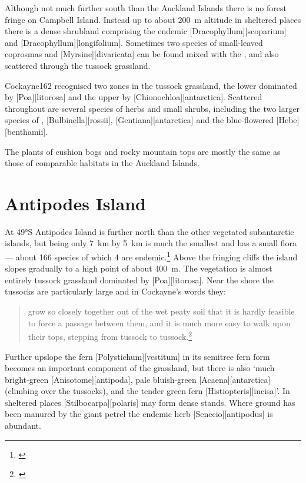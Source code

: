 Although not much further south than the Auckland Islands there is no forest fringe on Campbell Island.
Instead up to about \SI{200}{\metre} altitude in sheltered places there is a dense shrubland comprising the endemic [Dracophyllum][scoparium] and [Dracophyllum][longifolium].
Sometimes two species of small-leaved coprosmas and [Myrsine][divaricata] can be found mixed with the , and also scattered through the tussock grassland.

Cockayne162 recognised two zones in the tussock grassland, the lower dominated by [Poa][litorosa] and the upper by [Chionochloa][antarctica].
Scattered throughout are several species of herbs and small shrubs, including the two larger species of , [Bulbinella][rossii], [Gentiana][antarctica] and the blue-flowered [Hebe][benthamii].

The plants of cushion bogs and rocky mountain tops are mostly the same as those of comparable habitats in the Auckland Islands.

\section{Antipodes Island}

At \ang{49}S Antipodes Island is further north than the other vegetated subantarctic islands, but being only \SI{7}{\kilo\metre} by \SI{5}{\kilo\metre} is much the smallest and has a small flora --- about 166 species of which 4 are endemic.\footnote{\cite{williams1982species}}
Above the fringing cliffs the island slopes gradually to a high point of about \SI{400}{\metre}.
The vegetation is almost entirely tussock grassland dominated by [Poa][litorosa].
Near the shore the tussocks are particularly large and in Cockayne's words they:

\begin{quote}
	grow so closely together out of the wet peaty soil that it is hardly feasible to force a passage between them, and it is much more easy to walk upon their tops, stepping from tussock to tussock.\footnote{\cite{cockayne1909ecological}}
\end{quote}

Further upslope the fern [Polystichum][vestitum] in its semitree fern form becomes an important component of the grassland, but there is also `much bright-green [Anisotome][antipoda], pale bluish-green [Acaena][antarctica] (climbing over the tussocks), and the tender green fern [Histiopteris][incisa]'.
In sheltered places [Stilbocarpa][polaris] may form dense stands.
Where ground has been manured by the giant petrel the endemic herb [Senecio][antipodus] is abundant.

